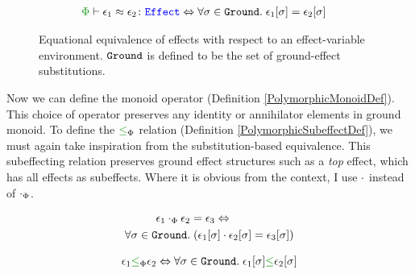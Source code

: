 \begin{figure}[H]
    \centering
    \begin{framed}
        \begin{align}
            \zpberelation{\e_1}{\e_2}{\effect} & \Leftrightarrow \forall \si\in\groundEffects.\s\e_1\ssi = \e_2\ssi
        \end{align}
    \end{framed}
    
    \caption{Equational equivalence of effects with respect to an effect-variable environment. $\groundEffects$ is defined to be the set of ground-effect substitutions.}
    \label{EffectEquivalence}
\end{figure}
Now we can define the monoid operator (Definition \ref{PolymorphicMonoidDef}). This choice of operator preserves any identity or annihilator elements in ground monoid. To define the $\subeffectp$ relation (Definition \ref{PolymorphicSubeffectDef}), we must again take inspiration from the substitution-based equivalence. This subeffecting relation preserves ground effect structures such as a \textit{top} effect, which has all effects as subeffects. Where it is obvious from the context, I use $\dot$ instead of $\dotp$.


\begin{minipage}{0.47\linewidth}
\begin{framed}
    \begin{definition}\label{PolymorphicMonoidDef}
        \begin{align*}
            \e_1\dotp\e_2 & = \e_3  \Leftrightarrow
            \\
            \forall \si \in\groundEffects. & \s (\e_1\ssi \dot \e_2\ssi = \e_3\ssi)
        \end{align*}
    \end{definition}
\end{framed}
\end{minipage}
\quad
\begin{minipage}{0.47\linewidth}
    \begin{framed}
        \begin{definition}
            \label{PolymorphicSubeffectDef}
            \begin{align*}
                \e_1\subeffectp\e_2\Leftrightarrow \forall\si\in\groundEffects.\s\e_1\ssi\subeffect\e_2\ssi
                \\
            \end{align*}
        \end{definition}
        \end{framed}
\end{minipage}



